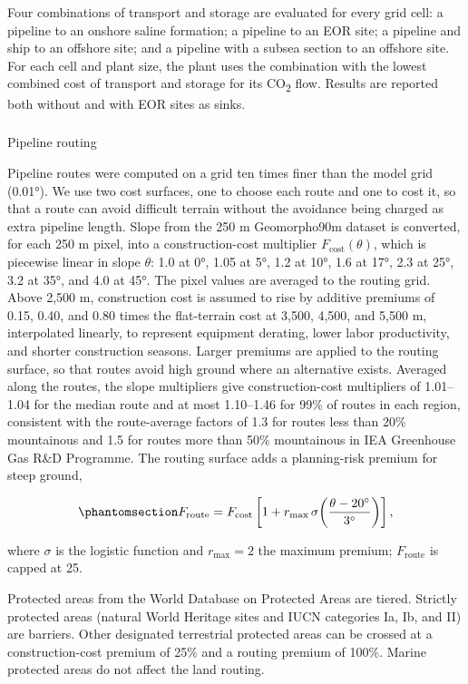 \documentclass[
  letterpaper,
  twoside,
  twocolumn,
  9pt]{article}
\makeatletter
\let\oldsubparagraph\subparagraph
\renewcommand{\subparagraph}{
    \@ifstar
      \xxxSubParagraphStar
      \xxxSubParagraphNoStar
  }
\newcommand{\xxxSubParagraphStar}[1]{\oldsubparagraph*{#1}\mbox{}}
\newcommand{\xxxSubParagraphNoStar}[1]{\oldsubparagraph{#1}\mbox{}}
\makeatother
\begin{document}
Four combinations of transport and storage are evaluated for every grid
cell: a pipeline to an onshore saline formation; a pipeline to an EOR
site; a pipeline and ship to an offshore site; and a pipeline with a
subsea section to an offshore site. For each cell and plant size, the
plant uses the combination with the lowest combined cost of transport
and storage for its CO\textsubscript{2} flow. Results are reported both
without and with EOR sites as sinks.

\subparagraph{Pipeline routing}\label{pipeline-routing}

Pipeline routes were computed on a grid ten times finer than the model
grid (0.01°). We use two cost surfaces, one to choose each route and one
to cost it, so that a route can avoid difficult terrain without the
avoidance being charged as extra pipeline length. Slope from the 250 m
Geomorpho90m dataset \citep{amatulli2020} is converted, for each 250 m
pixel, into a construction-cost multiplier
\(F_{\mathrm{cost}}(\theta)\), which is piecewise linear in slope
\(\theta\): 1.0 at 0°, 1.05 at 5°, 1.2 at 10°, 1.6 at 17°, 2.3 at 25°,
3.2 at 35°, and 4.0 at 45°. The pixel values are averaged to the routing
grid. Above 2,500 m, construction cost is assumed to rise by additive
premiums of 0.15, 0.40, and 0.80 times the flat-terrain cost at 3,500,
4,500, and 5,500 m, interpolated linearly, to represent equipment
derating, lower labor productivity, and shorter construction seasons.
Larger premiums are applied to the routing surface, so that routes avoid
high ground where an alternative exists. Averaged along the routes, the
slope multipliers give construction-cost multipliers of 1.01--1.04 for
the median route and at most 1.10--1.46 for 99\% of routes in each
region, consistent with the route-average factors of 1.3 for routes less
than 20\% mountainous and 1.5 for routes more than 50\% mountainous in
IEA Greenhouse Gas R\&D Programme\citep{ieaghg2002transmission}. The
routing surface adds a planning-risk premium for steep ground,

\begin{equation}\phantomsection\label{eq-route}{F_{\mathrm{route}} = F_{\mathrm{cost}} \left[ 1 + r_{\max}\, \sigma\!\left( \frac{\theta - 20^\circ}{3^\circ} \right) \right],}\end{equation}

where \(\sigma\) is the logistic function and \(r_{\max} = 2\) the
maximum premium; \(F_{\mathrm{route}}\) is capped at 25.

Protected areas from the World Database on Protected Areas
\citep{wdpa2026} are tiered. Strictly protected areas (natural World
Heritage sites and IUCN categories Ia, Ib, and II) are barriers. Other
designated terrestrial protected areas can be crossed at a
construction-cost premium of 25\% and a routing premium of 100\%. Marine
protected areas do not affect the land routing.
\end{document}
